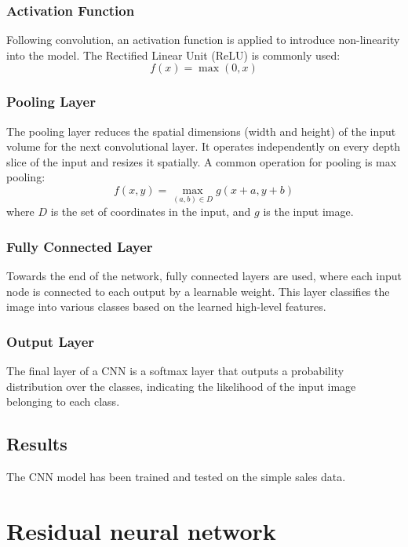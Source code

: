 \subsubsection{Activation Function}
Following convolution, an activation function is applied to introduce non-linearity into the model. The Rectified Linear Unit (ReLU) is commonly used:
\[f(x) = \max(0, x)\]

\subsubsection{Pooling Layer}
The pooling layer reduces the spatial dimensions (width and height) of the input volume for the next convolutional layer. It operates independently on every depth slice of the input and resizes it spatially. A common operation for pooling is max pooling:
\[f(x, y) = \max_{(a,b) \in D} g(x+a, y+b)\]
where \(D\) is the set of coordinates in the input, and \(g\) is the input image.

\subsubsection{Fully Connected Layer}
Towards the end of the network, fully connected layers are used, where each input node is connected to each output by a learnable weight. This layer classifies the image into various classes based on the learned high-level features.

\subsubsection{Output Layer}
The final layer of a CNN is a softmax layer that outputs a probability distribution over the classes, indicating the likelihood of the input image belonging to each class.


\subsection{Results}
The CNN model has been trained and tested on the simple sales data.







\section{Residual neural network}
